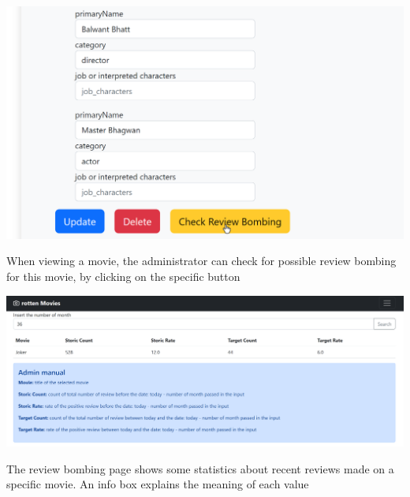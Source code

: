 \begin{center}
\includegraphics[scale=0.45]{../../../images/user_manual/check_review_bombing.png} 

\end{center}
\vspace{5pt}
When viewing a movie, the administrator can check for possible review bombing for this movie, by clicking on the specific button

\begin{center}
\includegraphics[scale=0.45]{../../../images/user_manual/review_bombing_page.png} 

\end{center}
\vspace{5pt}
The review bombing page shows some statistics about recent reviews made on a specific movie. An info box explains the meaning of each value


%